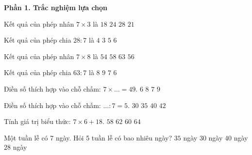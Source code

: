 \textbf{Phần 1. Trắc nghiệm lựa chọn}

\begin{ex} %
Kết quả của phép nhân $7 \times 3$ là
\choice
{$18$}
{$24$}
{$28$}
{\True $21$}
\end{ex}

\begin{ex} %
Kết quả của phép chia $28 : 7$ là
\choice
{\True $4$}
{$3$}
{$5$}
{$6$}
\end{ex}

\begin{ex} %
Kết quả của phép nhân $7 \times 8$ là
\choice
{$54$}
{$58$}
{$63$}
{\True $56$}
\end{ex}

\begin{ex} %
Kết quả của phép chia $63 : 7$ là
\choice
{$8$}
{\True $9$}
{$7$}
{$6$}
\end{ex}

\begin{ex} %
Điền số thích hợp vào chỗ chấm: $7 \times \dots = 49$.
\choice
{$6$}
{$8$}
{\True $7$}
{$9$}
\end{ex}

\begin{ex} %
Điền số thích hợp vào chỗ chấm: $\dots : 7 = 5$.
\choice
{$30$}
{\True $35$}
{$40$}
{$42$}
\end{ex}

\begin{ex} %
Tính giá trị biểu thức: $7 \times 6 + 18$.
\choice
{$58$}
{$62$}
{\True $60$}
{$64$}
\end{ex}

\begin{ex} %
Một tuần lễ có 7 ngày. Hỏi 5 tuần lễ có bao nhiêu ngày?
\choice
{\True $35$ ngày}
{$30$ ngày}
{$40$ ngày}
{$28$ ngày}
\end{ex}

